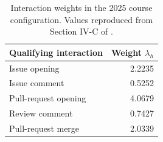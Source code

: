 \begin{table}[htbp]
\caption{Interaction weights in the 2025 course configuration. Values reproduced from Section IV-C of \citet{seetmanuscript}.}
\label{tab:ch7-weights}
\small\renewcommand{\arraystretch}{1.15}
\begin{tabularx}{\linewidth}{@{}>{\raggedright\arraybackslash}Xr@{}}\toprule
Qualifying interaction & Weight $\lambda_h$\\\midrule
Issue opening & 2.2235\\
Issue comment & 0.5252\\
Pull-request opening & 4.0679\\
Review comment & 0.7427\\
Pull-request merge & 2.0339\\\bottomrule
\end{tabularx}
\end{table}
